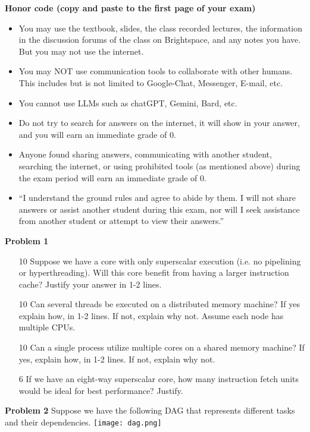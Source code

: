 \documentclass{article}
\begin{document}
\textbf{Honor code (copy and paste to the first page of your exam)}
\begin{itemize}
    \item You may use the textbook, slides, the class recorded lectures, the information in the discussion forums of the class on Brightspace, and any notes you have. But you may not use the internet.
    \item You may NOT use communication tools to collaborate with other humans. This includes but is not limited to Google-Chat, Messenger, E-mail, etc.
    \item You cannot use LLMs such as chatGPT, Gemini, Bard, etc.
    \item Do not try to search for answers on the internet, it will show in your answer, and you will earn an immediate grade of 0.
    \item Anyone found sharing answers, communicating with another student, searching the internet, or using prohibited tools (as mentioned above) during the exam period will earn an immediate grade of 0.
    \item “I understand the ground rules and agree to abide by them. I will not share answers or assist another student during this exam, nor will I seek assistance from another student or attempt to view their answers.”
\end{itemize}

\textbf{Problem 1}
\begin{enumerate}
    \item [10] Suppose we have a core with only superscalar execution (i.e. no pipelining or hyperthreading). Will this core benefit from having a larger instruction cache? Justify your answer in 1-2 lines.
    \item [10] Can several threads be executed on a distributed memory machine? If yes explain how, in 1-2 lines. If not, explain why not.  Assume each node has multiple CPUs.
    \item [10] Can a single process utilize multiple cores on a shared memory machine? If yes, explain how, in 1-2 lines. If not, explain why not.
    \item [6] If we have an eight-way superscalar core, how many instruction fetch units would be ideal for best performance? Justify.
\end{enumerate}

\textbf{Problem 2}
Suppose we have the following DAG that represents different tasks and their dependencies. \texttt{[image: dag.png]}
\end{document}

